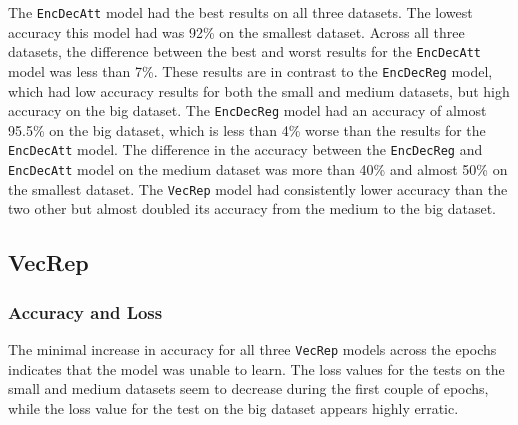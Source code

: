 The {\tt EncDecAtt} model had the best results on all three datasets. The lowest accuracy this model had was 92\% on the smallest dataset. Across all three datasets, the difference between the best and worst results for the {\tt EncDecAtt} model was less than 7\%. These results are in contrast to the {\tt EncDecReg} model, which had low accuracy results for both the small and medium datasets, but high accuracy on the big dataset. The {\tt EncDecReg} model had an accuracy of almost 95.5\% on the big dataset, which is less than 4\% worse than the results for the {\tt EncDecAtt} model. The difference in the accuracy between the {\tt EncDecReg} and {\tt EncDecAtt} model on the medium dataset was more than 40\% and almost 50\% on the smallest dataset. The {\tt VecRep} model had consistently lower accuracy than the two other but almost doubled its accuracy from the medium to the big dataset.

\subsection{VecRep}
\subsubsection{Accuracy and Loss}
\newpage
{}

The minimal increase in accuracy for all three {\tt VecRep} models across the epochs indicates that the model was unable to learn. The loss values for the tests on the small and medium datasets seem to decrease during the first couple of epochs, while the loss value for the test on the big dataset appears highly erratic.

\newpage
